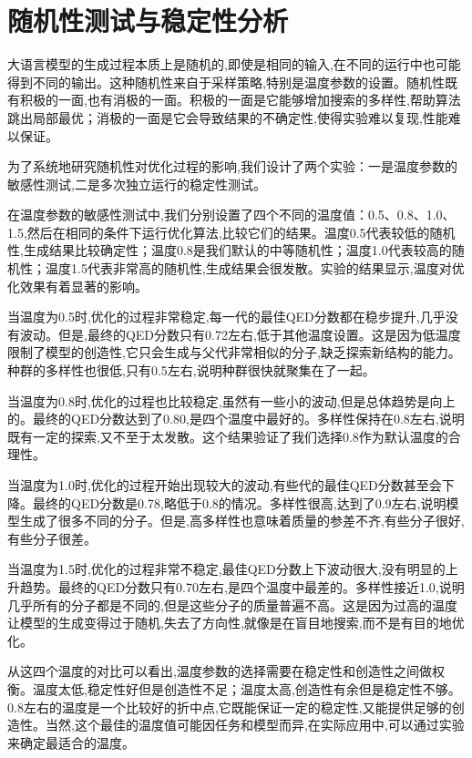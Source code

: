 \section{随机性测试与稳定性分析}

大语言模型的生成过程本质上是随机的,即使是相同的输入,在不同的运行中也可能得到不同的输出。这种随机性来自于采样策略,特别是温度参数的设置。随机性既有积极的一面,也有消极的一面。积极的一面是它能够增加搜索的多样性,帮助算法跳出局部最优；消极的一面是它会导致结果的不确定性,使得实验难以复现,性能难以保证。

为了系统地研究随机性对优化过程的影响,我们设计了两个实验：一是温度参数的敏感性测试,二是多次独立运行的稳定性测试。

在温度参数的敏感性测试中,我们分别设置了四个不同的温度值：0.5、0.8、1.0、1.5,然后在相同的条件下运行优化算法,比较它们的结果。温度0.5代表较低的随机性,生成结果比较确定性；温度0.8是我们默认的中等随机性；温度1.0代表较高的随机性；温度1.5代表非常高的随机性,生成结果会很发散。实验的结果显示,温度对优化效果有着显著的影响。

当温度为0.5时,优化的过程非常稳定,每一代的最佳QED分数都在稳步提升,几乎没有波动。但是,最终的QED分数只有0.72左右,低于其他温度设置。这是因为低温度限制了模型的创造性,它只会生成与父代非常相似的分子,缺乏探索新结构的能力。种群的多样性也很低,只有0.5左右,说明种群很快就聚集在了一起。

当温度为0.8时,优化的过程也比较稳定,虽然有一些小的波动,但是总体趋势是向上的。最终的QED分数达到了0.80,是四个温度中最好的。多样性保持在0.8左右,说明既有一定的探索,又不至于太发散。这个结果验证了我们选择0.8作为默认温度的合理性。

当温度为1.0时,优化的过程开始出现较大的波动,有些代的最佳QED分数甚至会下降。最终的QED分数是0.78,略低于0.8的情况。多样性很高,达到了0.9左右,说明模型生成了很多不同的分子。但是,高多样性也意味着质量的参差不齐,有些分子很好,有些分子很差。

当温度为1.5时,优化的过程非常不稳定,最佳QED分数上下波动很大,没有明显的上升趋势。最终的QED分数只有0.70左右,是四个温度中最差的。多样性接近1.0,说明几乎所有的分子都是不同的,但是这些分子的质量普遍不高。这是因为过高的温度让模型的生成变得过于随机,失去了方向性,就像是在盲目地搜索,而不是有目的地优化。

从这四个温度的对比可以看出,温度参数的选择需要在稳定性和创造性之间做权衡。温度太低,稳定性好但是创造性不足；温度太高,创造性有余但是稳定性不够。0.8左右的温度是一个比较好的折中点,它既能保证一定的稳定性,又能提供足够的创造性。当然,这个最佳的温度值可能因任务和模型而异,在实际应用中,可以通过实验来确定最适合的温度。

